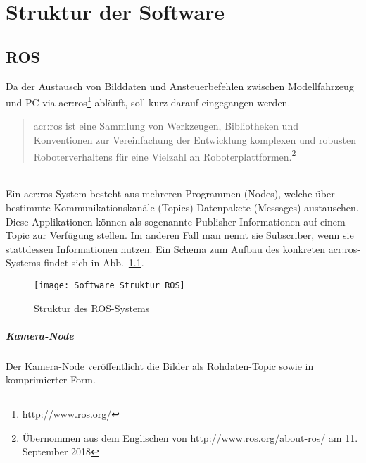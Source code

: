 \chapter{Struktur der Software \dcsecondauthorshort}
\label{cha:software_struktur}

\section{ROS \dcsecondauthorshort}
Da der Austausch von Bilddaten und Ansteuerbefehlen zwischen Modellfahrzeug und PC via \gls{acr:ros}\footnote{http://www.ros.org/} abläuft, soll kurz darauf eingegangen werden. 
\begin{quotation}
\gls{acr:ros} ist eine Sammlung von Werkzeugen, Bibliotheken und Konventionen zur Vereinfachung der Entwicklung komplexen und robusten Roboterverhaltens für eine Vielzahl an Roboterplattformen.\footnote{Übernommen aus dem Englischen von http://www.ros.org/about-ros/ am 11. September 2018}
\end{quotation}

\label{ssec:software_struktur:ros:nodes}
\ \\
Ein \gls{acr:ros}-System besteht aus mehreren Programmen (\glqq Nodes\grqq ), welche über bestimmte Kommunikationskanäle (\glqq Topics\grqq ) Datenpakete (\glqq Messages\grqq ) austauschen. Diese Applikationen können als sogenannte Publisher Informationen auf einem Topic zur Verfügung stellen. Im anderen Fall man nennt sie Subscriber, wenn sie stattdessen Informationen nutzen. Ein Schema zum Aufbau des konkreten \gls{acr:ros}-Systems findet sich in Abb.~\ref{fig:software_struktur:ros}.

\begin{figure}[htbp]
	\centering
	\texttt{[image: Software\_Struktur\_ROS]}
	\caption{Struktur des ROS-Systems}
	\label{fig:software_struktur:ros}
\end{figure}

\paragraph{Kamera-Node}
Der Kamera-Node veröffentlicht die Bilder als Rohdaten-Topic sowie in komprimierter Form.
